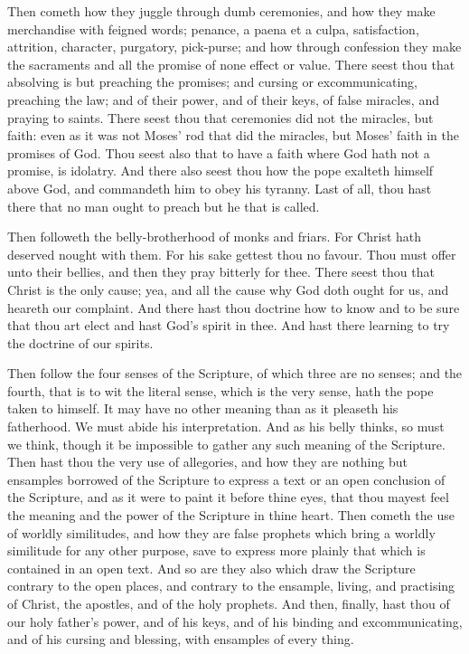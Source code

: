 Then cometh how they juggle through dumb ceremonies,
and how they make merchandise with feigned words; 
penance, a paena et a culpa, satisfaction, attrition, character,
purgatory, pick-purse; and how through confession 
they make the sacraments and all the promise of none 
effect or value. There seest thou that absolving is but 
preaching the promises; and cursing or excommunicating, 
preaching the law; and of their power, and of their keys, 
of false miracles, and praying to saints. There seest thou 
that ceremonies did not the miracles, but faith: even as it 
was not Moses' rod that did the miracles, but Moses' 
faith in the promises of God. Thou seest also that to 
have a faith where God hath not a promise, is idolatry. 
And there also seest thou how the pope exalteth himself 
above God, and commandeth him to obey his tyranny. 
Last of all, thou hast there that no man ought to preach 
but he that is called. 

Then followeth the belly-brotherhood of monks and 
friars. For Christ hath deserved nought with them. For 
his sake gettest thou no favour. Thou must offer unto 
their bellies, and then they pray bitterly for thee. There 
seest thou that Christ is the only cause; yea, and all the 
cause why God doth ought for us, and heareth our complaint.
And there hast thou doctrine how to know and 
to be sure that thou art elect and hast God's spirit in thee. 
And hast there learning to try the doctrine of our spirits. 

Then follow the four senses of the Scripture, of which 
three are no senses; and the fourth, that is to wit the literal 
sense, which is the very sense, hath the pope taken to himself.
It may have no other meaning than as it pleaseth 
his fatherhood. We must abide his interpretation. And 
as his belly thinks, so must we think, though it be impossible
to gather any such meaning of the Scripture. Then 
hast thou the very use of allegories, and how they are 
nothing but ensamples borrowed of the Scripture to express
a text or an open conclusion of the Scripture, and as 
it were to paint it before thine eyes, that thou mayest feel 
the meaning and the power of the Scripture in thine heart. 
Then cometh the use of worldly similitudes, and how
they are false prophets which bring a worldly similitude 
for any other purpose, save to express more plainly that 
which is contained in an open text. And so are they also 
which draw the Scripture contrary to the open places, and 
contrary to the ensample, living, and practising of Christ, 
the apostles, and of the holy prophets. And then, finally, 
hast thou of our holy father's power, and of his keys, and 
of his binding and excommunicating, and of his cursing 
and blessing, with ensamples of every thing. 
